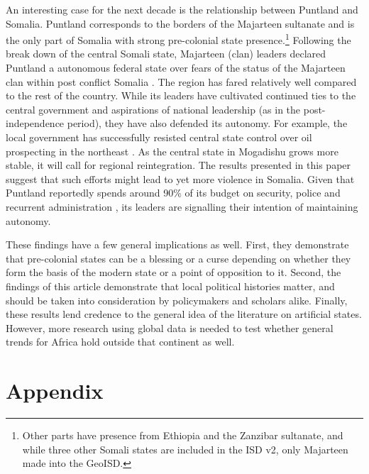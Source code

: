 \documentclass[12pt]{article}
\begin{document}
An interesting case for the next decade is the relationship between Puntland and
Somalia. Puntland corresponds to the borders of the Majarteen sultanate and is
the only part of Somalia with strong pre-colonial state
presence.\footnote{Other parts have presence from Ethiopia and the Zanzibar
sultanate, and while three other Somali states are included in the ISD v2, only
Majarteen made into the GeoISD.} Following the break down of the central
Somali state, Majarteen (clan) leaders declared Puntland a autonomous federal
state over fears of the status of the Majarteen clan within post conflict
Somalia \citep{Johnson_2014}. The region has fared relatively well compared to the
rest of the country. While its leaders have cultivated continued ties to the
central government and aspirations of national leadership (as in the
post-independence period), they have also defended its autonomy. For example,
the local government has successfully resisted central state control over oil
prospecting in the northeast \citep{Johnson_2014}. As the central state in
Mogadishu grows more stable, it will call for regional reintegration. The
results presented in this paper suggest that such efforts might lead to yet more
violence in Somalia. Given that Puntland reportedly spends around 90\% of its
budget on security, police and recurrent administration \citep{Johnson_2014},
its leaders are signalling their intention of maintaining autonomy.

These findings have a few general implications as well. First, they demonstrate
that pre-colonial states can be a blessing or a curse depending on whether they
form the basis of the modern state or a point of opposition to it. Second, the
findings of this article demonstrate that local political histories matter, and
should be taken into consideration by policymakers and scholars alike. Finally,
these results lend credence to the general idea of the literature on artificial
states. However, more research using global data is needed to test whether
general trends for Africa hold outside that continent as well.

\clearpage




\clearpage

\section{Appendix}
\end{document}
